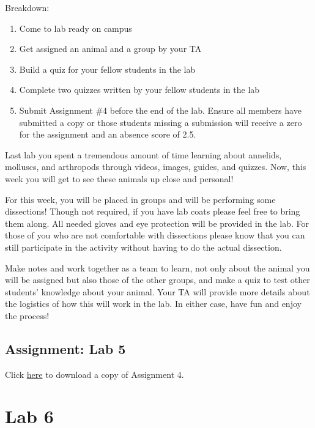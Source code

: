 \documentclass[
]{book}
\providecommand{\tightlist}{%
  \setlength{\itemsep}{0pt}\setlength{\parskip}{0pt}}
\begin{document}
Breakdown:

\begin{enumerate}
\def\labelenumi{\arabic{enumi}.}
\tightlist
\item
  Come to lab ready on campus
\item
  Get assigned an animal and a group by your TA
\item
  Build a quiz for your fellow students in the lab
\item
  Complete two quizzes written by your fellow students in the lab
\item
  Submit Assignment \#4 before the end of the lab. Ensure all members have submitted a copy or those students missing a submission will receive a zero for the assignment and an absence score of 2.5.
\end{enumerate}

Last lab you spent a tremendous amount of time learning about annelids, molluscs, and arthropods through videos, images, guides, and quizzes. Now, this week you will get to see these animals up close and personal!

For this week, you will be placed in groups and will be performing some dissections! Though not required, if you have lab coats please feel free to bring them along. All needed gloves and eye protection will be provided in the lab. For those of you who are not comfortable with dissections please know that you can still participate in the activity without having to do the actual dissection.

Make notes and work together as a team to learn, not only about the animal you will be assigned but also those of the other groups, and make a quiz to test other students' knowledge about your animal. Your TA will provide more details about the logistics of how this will work in the lab. In either case, have fun and enjoy the process!

\hypertarget{assignment-lab-5}{%
\chapter*{Assignment: Lab 5}\label{assignment-lab-5}}

Click \href{files/Lab5_Assignment.pdf}{here} to download a copy of Assignment 4.

\hypertarget{part-lab-6}{%
\part*{Lab 6}\label{part-lab-6}}
\end{document}

